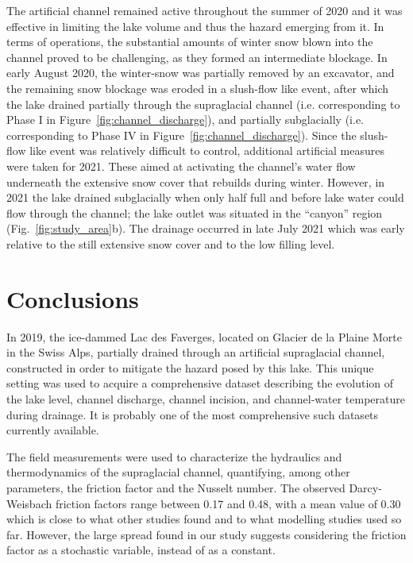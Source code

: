 The artificial channel remained active throughout the summer of 2020 and it was effective in limiting the lake volume and thus the hazard emerging from it. In terms of operations, the substantial amounts of winter snow blown into the channel proved to be challenging, as they formed an intermediate blockage. In early August 2020, the winter-snow was partially removed by an excavator, and the remaining snow blockage was eroded in a slush-flow like event, after which the lake drained partially through the supraglacial channel (i.e. corresponding to Phase I in Figure~\ref{fig:channel_discharge}), and partially subglacially (i.e. corresponding to Phase IV in Figure~\ref{fig:channel_discharge}). Since the slush-flow like event was relatively difficult to control, additional artificial measures were taken for 2021. These aimed at activating the channel’s water flow underneath the extensive snow cover that rebuilds during winter.
%
However, in 2021 the lake drained subglacially when only half full and before lake water could flow through the channel; the lake outlet was situated in the ``canyon'' region (Fig.~\ref{fig:study_area}b).  The drainage occurred in late July 2021 which was early relative to the still extensive snow cover and to the low filling level.

\section{Conclusions}

In 2019, the ice-dammed Lac des Faverges, located on Glacier de la  Plaine Morte in the Swiss Alps, partially drained through an artificial supraglacial channel, constructed in order to mitigate the hazard posed by this lake.
This unique setting was used to acquire a comprehensive dataset describing the evolution of the lake level, channel discharge, channel incision, and channel-water temperature during drainage.
It is probably one of the most comprehensive such datasets currently available.


The field measurements were used to characterize the  hydraulics and thermodynamics of the supraglacial channel, quantifying, among other parameters, the friction factor and the Nusselt number.
The observed Darcy-Weisbach friction factors range between 0.17 and 0.48, with a mean value of 0.30 which is close to what other studies found and to what modelling studies used so far. However, the large spread found in our study suggests considering the friction factor as a stochastic variable, instead of as a constant.

